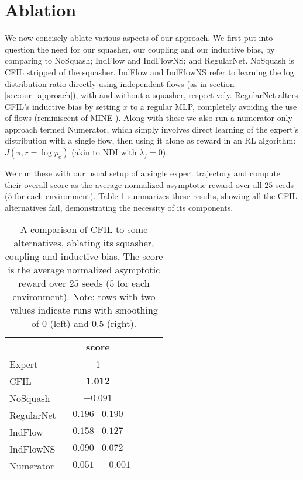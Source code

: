 \section{Ablation}\label{section:ablation}
We now concisely ablate various aspects of our approach. We first put into question the need for our squasher, our coupling and our inductive bias, by comparing to NoSquash; IndFlow and IndFlowNS; and RegularNet. NoSquash is CFIL stripped of the squasher. IndFlow and IndFlowNS refer to learning the log distribution ratio directly using independent flows (as in section \ref{sec:our_approach}), with and without a squasher, respectively. RegularNet alters CFIL's inductive bias by setting $x$ to a regular MLP, completely avoiding the use of flows (reminiscent of MINE \cite{belghazi2018mine}). Along with these we also run a numerator only approach termed Numerator, which simply involves direct learning of the expert's distribution with a single flow, then using it alone as reward in an RL algorithm: $J(\pi, r{=}\log p_e)$  (akin to NDI \cite{kim2021imitation} with $\lambda_f=0$). 

We run these with our usual setup of a single expert trajectory and compute their overall score as the average normalized asymptotic reward over all $25$ seeds ($5$ for each environment). Table \ref{table:ablation_regnet} summarizes these results, showing all the CFIL alternatives fail, demonstrating the necessity of its components.
\begin{table}[t]
\caption{A comparison of CFIL to some alternatives, ablating its squasher, coupling and inductive bias. The score is the average normalized asymptotic reward over $25$ seeds ($5$ for each environment). Note: rows with two values indicate runs with smoothing of $0$ (left) and $0.5$ (right).}
\label{table:ablation_regnet}
\vskip 0.15in
\begin{center}
\begin{small}
\begin{sc}
\begin{tabular}{lcccr}
\toprule
 & score \\
\midrule
Expert & 1 \\
\midrule
CFIL    & $\textbf{1.012}$ \\
NoSquash & $-0.091$\\
RegularNet & $0.196 \mid 0.190$\\
IndFlow    & $0.158 \mid 0.127 $\\
IndFlowNS  & $0.090 \mid 0.072$\\
Numerator  & $-0.051 \mid -0.001$\\
\bottomrule
\end{tabular}
\end{sc}
\end{small}
\end{center}
\vskip -0.1in
\end{table}

